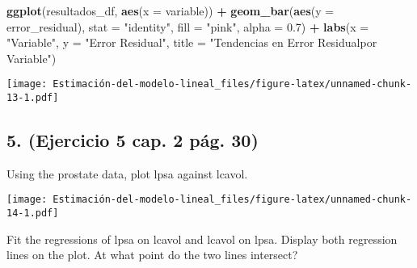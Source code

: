 \documentclass[
]{article}
\newenvironment{Shaded}{\begin{snugshade}}{\end{snugshade}}
\newcommand{\AttributeTok}[1]{\textcolor[rgb]{0.13,0.29,0.53}{#1}}
\newcommand{\CommentTok}[1]{\textcolor[rgb]{0.56,0.35,0.01}{\textit{#1}}}
\newcommand{\DecValTok}[1]{\textcolor[rgb]{0.00,0.00,0.81}{#1}}
\newcommand{\FloatTok}[1]{\textcolor[rgb]{0.00,0.00,0.81}{#1}}
\newcommand{\FunctionTok}[1]{\textcolor[rgb]{0.13,0.29,0.53}{\textbf{#1}}}
\newcommand{\NormalTok}[1]{#1}
\newcommand{\SpecialCharTok}[1]{\textcolor[rgb]{0.81,0.36,0.00}{\textbf{#1}}}
\newcommand{\StringTok}[1]{\textcolor[rgb]{0.31,0.60,0.02}{#1}}
\begin{document}
\begin{Shaded}
\begin{Highlighting}[]
\FunctionTok{ggplot}\NormalTok{(resultados\_df, }\FunctionTok{aes}\NormalTok{(}\AttributeTok{x =}\NormalTok{ variable)) }\SpecialCharTok{+}
  \FunctionTok{geom\_bar}\NormalTok{(}\FunctionTok{aes}\NormalTok{(}\AttributeTok{y =}\NormalTok{ error\_residual), }\AttributeTok{stat =} \StringTok{"identity"}\NormalTok{, }\AttributeTok{fill =} \StringTok{"pink"}\NormalTok{, }\AttributeTok{alpha =} \FloatTok{0.7}\NormalTok{) }\SpecialCharTok{+}
  \FunctionTok{labs}\NormalTok{(}\AttributeTok{x =} \StringTok{"Variable"}\NormalTok{, }\AttributeTok{y =} \StringTok{"Error Residual"}\NormalTok{, }\AttributeTok{title =} \StringTok{"Tendencias en Error Residualpor Variable"}\NormalTok{)}
\end{Highlighting}
\end{Shaded}

\texttt{[image: Estimación-del-modelo-lineal\_files/figure-latex/unnamed-chunk-13-1.pdf]}

\hypertarget{ejercicio-5-cap.-2-puxe1g.-30}{%
\subsection{5. (Ejercicio 5 cap. 2 pág.
30)}\label{ejercicio-5-cap.-2-puxe1g.-30}}

Using the prostate data, plot lpsa against lcavol.

\begin{Shaded}
\end{Shaded}

\texttt{[image: Estimación-del-modelo-lineal\_files/figure-latex/unnamed-chunk-14-1.pdf]}

Fit the regressions of lpsa on lcavol and lcavol on lpsa. Display both
regression lines on the plot. At what point do the two lines intersect?
\end{document}
